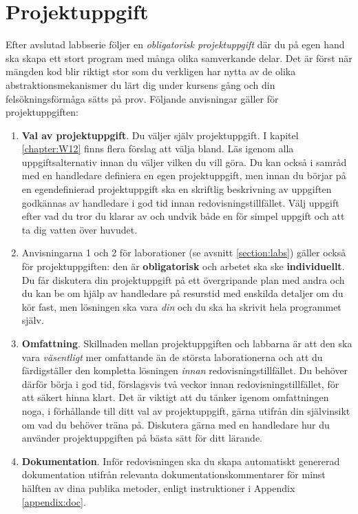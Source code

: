\section{Projektuppgift}\label{section:lab:Projekt}

Efter avslutad labbserie följer en \emph{obligatorisk projektuppgift} där du på egen hand ska skapa ett stort program med många olika samverkande delar. Det är först när mängden kod blir riktigt stor som du verkligen har nytta av de olika abstraktionsmekanismer du lärt dig under kursens gång och din felsökningsförmåga sätts på prov. Följande anvisningar gäller för projektuppgiften:

\begin{enumerate}
\item \textbf{Val av projektuppgift}.
Du väljer själv projektuppgift. I kapitel \ref{chapter:W12} finns flera förslag att välja bland. Läs igenom alla uppgiftsalternativ innan du väljer vilken du vill göra. Du kan också i samråd med en handledare definiera en egen projektuppgift, men innan du börjar på en egendefinierad projektuppgift ska en skriftlig beskrivning av uppgiften godkännas av handledare i god tid innan redovisningstillfället. Välj uppgift efter vad du tror du klarar av och undvik både en för simpel uppgift och att ta dig vatten över huvudet.

\item
Anvisningarna 1 och 2 för laborationer (se avsnitt \ref{section:labs}) gäller också för projektuppgiften: den är \textbf{obligatorisk} och arbetet ska ske \textbf{individuellt}.
Du får diskutera din projektuppgift på ett övergripande plan med andra och du kan be om hjälp av handledare på resurstid med enskilda detaljer om du kör fast, men lösningen ska vara \emph{din} och du ska ha skrivit hela programmet själv.


\item \textbf{Omfattning}.
Skillnaden mellan projektuppgiften och labbarna är att den ska vara \emph{väsentligt} mer omfattande än de största laborationerna och att du färdigställer den kompletta lösningen  \emph{innan} redovisningstillfället. Du behöver därför börja i god tid, förslagsvis två veckor innan redovisningstillfället, för att säkert hinna klart. Det är viktigt att du tänker igenom omfattningen noga, i förhållande till ditt val av projektuppgift, gärna utifrån din självinsikt om vad du behöver träna på. Diskutera gärna med en handledare hur du använder projektuppgiften på bästa sätt för ditt lärande.

\item \textbf{Dokumentation}. Inför redovisningen ska du skapa automatiskt genererad dokumentation utifrån relevanta dokumentationskommentarer för minst hälften av dina publika metoder, enligt instruktioner i Appendix \ref{appendix:doc}.


\end{enumerate}
